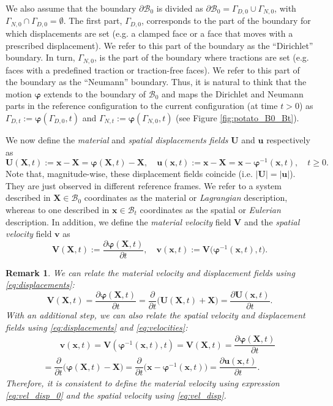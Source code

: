 \documentclass{sfuthesis}
\numberwithin{equation}{section}
\numberwithin{figure}{chapter}
\numberwithin{table}{chapter}
\newtheorem{remark}[theorem]{Remark}
\theoremstyle{definition}
\def\*#1{{\mathbf{#1}}} %
\newcommand{\pder}[2]{\dfrac{\partial #1}{\partial #2}}
\newcommand{\B}{\mathcal{B}}
\def\bphi{{\bm{\varphi}}}
\begin{document}
We also assume that the boundary $\partial \B_0$ is divided as $\partial \B_0 = \Gamma_{D,0} \cup \Gamma_{N,0}$, with $\Gamma_{N,0} \cap \Gamma_{D,0} = \emptyset$. The first part, $\Gamma_{D,0}$, corresponds to the part of the boundary for which displacements are set (e.g. a clamped face or a face that moves with a prescribed displacement). We refer to this part of the boundary as the ``Dirichlet'' boundary. In turn, $\Gamma_{N,0}$, is the part of the boundary where tractions are set (e.g. faces with a predefined traction or traction-free faces). We refer to this part of the boundary as the ``Neumann'' boundary. Thus, it is natural to think that the motion $\bphi$ extends to the boundary of $\B_0$ and maps the Dirichlet and Neumann parts in the reference configuration to the current configuration (at time $t>0$) as $\Gamma_{D,t} := \bphi(\Gamma_{D,0}, t)$ and $\Gamma_{N,t} := \bphi(\Gamma_{N,0}, t)$ (see Figure \ref{fig:potato_B0_Bt}).

We now define the \textit{material} and \textit{spatial displacements fields} $\*U$ and $\*u$ respectively as
\begin{equation}\label{eq:displacements}
\*U(\*X,t) := \*x - \*X = \bphi(\*X,t) - \*X, \quad \*u(\*x,t) := \*x - \*X = \*x - \bphi^{-1}(\*x,t), \quad t \geq 0.
\end{equation}
Note that, magnitude-wise, these displacement fields coincide (i.e. $|\*U|=|\*u|$). They are just observed in different reference frames. We refer to a system described in $\*X \in \B_0$ coordinates as the material or \textit{Lagrangian} description, whereas to one described in $\*x \in \B_t$ coordinates as the spatial or \textit{Eulerian} description. In addition, we define the \textit{material velocity} field $\*V$ and the \textit{spatial velocity} field $\*v$ as
\begin{equation}\label{eq:velocities}
\*V(\*X,t) := \pder{\bphi(\*X,t)}{t}, \quad \*v(\*x,t) := \*V\big(\bphi^{-1}(\*x,t), t\big).
\end{equation}

\begin{remark} \label{re:velocity_def}
We can relate the material velocity and displacement fields using \eqref{eq:displacements}:
\begin{equation} \label{eq:vel_disp_0}
\*V(\*X,t) = \pder{\bphi(\*X,t)}{t} = \pder{}{t}\Big( \*U(\*X,t) + \*X \Big) = \pder{\*U(\*x,t)}{t}.
\end{equation}
With an additional step, we can also relate the spatial velocity and displacement fields using \eqref{eq:displacements} and \eqref{eq:velocities}:
\begin{multline} \label{eq:vel_disp}
\qquad \*v(\*x,t) = \*V(\bphi^{-1}(\*x,t),t) = \*V(\*X,t) = \pder{\bphi(\*X,t)}{t} \\
= \pder{}{t} \Big( \bphi(\*X,t) - \*X \Big) = \pder{}{t} \Big(\*x - \bphi^{-1}(\*x,t) \Big) = \pder{\*u(\*x,t)}{t}. \qquad 
\end{multline}
Therefore, it is consistent to define the material velocity using expression  \eqref{eq:vel_disp_0} and the spatial velocity using \eqref{eq:vel_disp}.
\end{remark}
\end{document}
